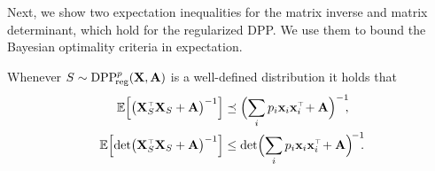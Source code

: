 \documentclass[../../thesis.tex]{subfiles}
\begin{document}
Next, we show two expectation inequalities for the matrix inverse and
matrix determinant, which hold for the regularized DPP.
We use them to bound the Bayesian optimality criteria in expectation.
\begin{lemma}\label{t:expectations}
  Whenever $S\sim {{\mathrm{DPP}}_{\!\mathrm{reg}}^{p}}(\mathbf X,\mathbf A)$ is a well-defined distribution it holds that
  \begin{align}
    \E\Big[\big(\X_S^\top\X_S+\A\big)^{-1}\Big]
     & \preceq \Big(\!
    \sum_ip_i\x_i\x_i^\top \!+\A \Big)^{-1}\!\!,\label{eq:sqinv}
    \\
    \E\Big[\!\det\!\big(\X_S^\top\X_S+\A\big)^{-1}\Big]
     & \leq\det\!\Big(\!
    \sum_ip_i\x_i\x_i^\top\!+\A \Big)^{\!-1}\!\!.\!\!\label{eq:det}
  \end{align}
\end{lemma}
\end{document}
